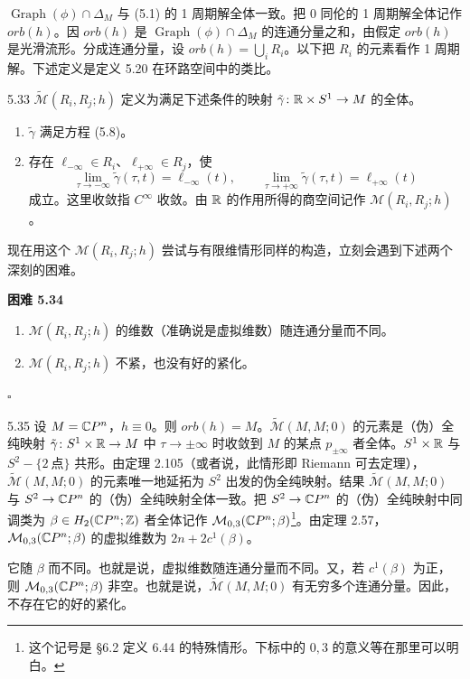 $\operatorname{Graph}(\phi)\cap\Delta_M$ 与 (5.1) 的 1 周期解全体一致。把 0 同伦的 1 周期解全体记作 $orb(h)$。因 $orb(h)$ 是 $\operatorname{Graph}(\phi)\cap\Delta_M$ 的连通分量之和，由假定 $orb(h)$ 是光滑流形。分成连通分量，设 $orb(h)=\bigcup_iR_i$。以下把 $R_i$ 的元素看作 1 周期解。下述定义是定义 5.20 在环路空间中的类比。

\begin{definition}{5.33}
  $\tilde{\mathcal{M}}(R_i,R_j;h)$ 定义为满足下述条件的映射 $\tilde\gamma\colon\mathbb{R}\times S^1\to M$ 的全体。
  \begin{enumerate}[label=（\arabic*）,leftmargin=2.8em]

    \item $\tilde\gamma$ 满足方程 (5.8)。
    \item 存在 $\ell_{-\infty}\in R_i$、$\ell_{+\infty}\in R_j$，使
    \[
      \lim_{\tau\to-\infty}\tilde\gamma(\tau,t)=\ell_{-\infty}(t),\qquad
      \lim_{\tau\to+\infty}\tilde\gamma(\tau,t)=\ell_{+\infty}(t)
    \]
    成立。这里收敛指 $C^\infty$ 收敛。由 $\mathbb{R}$ 的作用所得的商空间记作 $\mathcal{M}(R_i,R_j;h)$。
  \end{enumerate}
\end{definition}

现在用这个 $\mathcal{M}(R_i,R_j;h)$ 尝试与有限维情形同样的构造，立刻会遇到下述两个深刻的困难。

\textbf{困难 5.34}
\begin{enumerate}[label=（\arabic*）,leftmargin=2.8em]
  \item $\mathcal{M}(R_i,R_j;h)$ 的维数（准确说是虚拟维数）随连通分量而不同。
  \item $\mathcal{M}(R_i,R_j;h)$ 不紧，也没有好的紧化。
\end{enumerate}
\hfill$\square$

\begin{example}{5.35}
  设 $M=\mathbb{C}P^n$，$h\equiv0$。则 $orb(h)=M$。$\tilde{\mathcal{M}}(M,M;0)$ 的元素是（伪）全纯映射 $\tilde\gamma\colon S^1\times\mathbb{R}\to M$ 中 $\tau\to\pm\infty$ 时收敛到 $M$ 的某点 $p_{\pm\infty}$ 者全体。$S^1\times\mathbb{R}$ 与 $S^2-\{2\ \text{点}\}$ 共形。由定理 2.105（或者说，此情形即 Riemann 可去定理），$\tilde{\mathcal{M}}(M,M;0)$ 的元素唯一地延拓为 $S^2$ 出发的伪全纯映射。结果 $\tilde{\mathcal{M}}(M,M;0)$ 与 $S^2\to\mathbb{C}P^n$ 的（伪）全纯映射全体一致。把 $S^2\to\mathbb{C}P^n$ 的（伪）全纯映射中同调类为 $\beta\in H_2(\mathbb{C}P^n;\mathbb{Z})$ 者全体记作 $\mathcal{M}_{0,3}(\mathbb{C}P^n;\beta)$\footnote{这个记号是 §6.2 定义 6.44 的特殊情形。下标中的 $0,3$ 的意义等在那里可以明白。}。由定理 2.57，$\mathcal{M}_{0,3}(\mathbb{C}P^n;\beta)$ 的虚拟维数为 $2n+2c^1(\beta)$。

  它随 $\beta$ 而不同。也就是说，虚拟维数随连通分量而不同。又，若 $c^1(\beta)$ 为正，则 $\mathcal{M}_{0,3}(\mathbb{C}P^n;\beta)$ 非空。也就是说，$\tilde{\mathcal{M}}(M,M;0)$ 有无穷多个连通分量。因此，不存在它的好的紧化。
\end{example}

